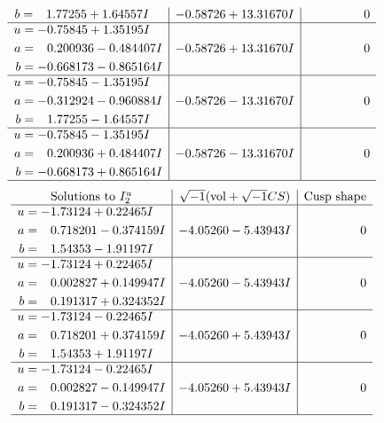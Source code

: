 \documentclass[1p]{elsarticle_modified}
\theoremstyle{definition}
\newcommand{\I}{\sqrt{-1}}
\begin{document}
$$\begin{array}{c|c|c}
\begin{aligned}
b &= \phantom{-}1.77255 + 1.64557 I\end{aligned}
 & -0.58726 + 13.31670 I & \phantom{-0.000000 } 0 \\ \hline\begin{aligned}
u &= -0.75845 + 1.35195 I \\
a &= \phantom{-}0.200936 - 0.484407 I \\
b &= -0.668173 - 0.865164 I\end{aligned}
 & -0.58726 + 13.31670 I & \phantom{-0.000000 } 0 \\ \hline\begin{aligned}
u &= -0.75845 - 1.35195 I \\
a &= -0.312924 - 0.960884 I \\
b &= \phantom{-}1.77255 - 1.64557 I\end{aligned}
 & -0.58726 - 13.31670 I & \phantom{-0.000000 } 0 \\ \hline\begin{aligned}
u &= -0.75845 - 1.35195 I \\
a &= \phantom{-}0.200936 + 0.484407 I \\
b &= -0.668173 + 0.865164 I\end{aligned}
 & -0.58726 - 13.31670 I & \phantom{-0.000000 } 0\\
 \hline 
 \end{array}$$\newpage$$\begin{array}{c|c|c}  
\text{Solutions to }I^u_{2}& \I (\text{vol} + \sqrt{-1}CS) & \text{Cusp shape}\\
 \hline 
\begin{aligned}
u &= -1.73124 + 0.22465 I \\
a &= \phantom{-}0.718201 - 0.374159 I \\
b &= \phantom{-}1.54353 - 1.91197 I\end{aligned}
 & -4.05260 - 5.43943 I & \phantom{-0.000000 } 0 \\ \hline\begin{aligned}
u &= -1.73124 + 0.22465 I \\
a &= \phantom{-}0.002827 + 0.149947 I \\
b &= \phantom{-}0.191317 + 0.324352 I\end{aligned}
 & -4.05260 - 5.43943 I & \phantom{-0.000000 } 0 \\ \hline\begin{aligned}
u &= -1.73124 - 0.22465 I \\
a &= \phantom{-}0.718201 + 0.374159 I \\
b &= \phantom{-}1.54353 + 1.91197 I\end{aligned}
 & -4.05260 + 5.43943 I & \phantom{-0.000000 } 0 \\ \hline\begin{aligned}
u &= -1.73124 - 0.22465 I \\
a &= \phantom{-}0.002827 - 0.149947 I \\
b &= \phantom{-}0.191317 - 0.324352 I\end{aligned}
 & -4.05260 + 5.43943 I & \phantom{-0.000000 } 0\\
 \hline 
 \end{array}$$\newpage\newpage\renewcommand{\arraystretch}{1}
\end{document}
